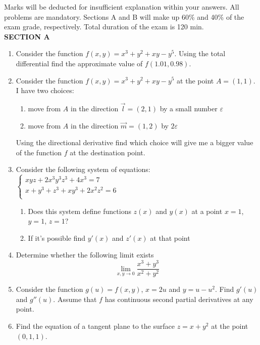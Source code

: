 \documentclass[pdftex,12pt,a4paper]{article}
\begin{document}


Marks will be deducted for insufficient explanation within your answers. All problems are mandatory. Sections A and B will make up 60\% and 40\% of the exam grade, respectively. Total duration of the exam is 120 min. \\

\textbf{SECTION A}
\vspace{20pt}

\begin{enumerate}
\item Consider the function $f(x,y)=x^3+y^2+xy-y^5$. Using the total differential find the approximate value of $f(1.01,0.98)$.
\item Consider the function $f(x,y)=x^3+y^2+xy-y^5$ at the point $A=(1,1)$. I have two choices:
\begin{enumerate}
\item move from $A$ in the direction $\vec{l}=(2,1)$ by a small number $\varepsilon$ 
\item move from $A$ in the direction $\vec{m}=(1,2)$ by $2\varepsilon$
\end{enumerate}
Using the directional derivative find which choice will give me a bigger value of the function $f$ at the destination point.

\item Consider the following system of equations:\\
$\left\{\begin{array}{l}
xyz+2x^3y^3z^3+4x^3=7\\
x+y^3+z^3+xy^3+2x^2z^2=6\\
\end{array}\right.$
\begin{enumerate}
\item Does this system define functions $z(x)$ and $y(x)$ at a point $x=1$, $y=1$, $z=1$?
\item If it's possible find $y'(x)$ and $z'(x)$ at that point
\end{enumerate}

\item Determine whether the following limit exists
\begin{equation} \nonumber
\lim_{x, y\to 0} \frac{x^3+y^3}{x^2+y^2}
\end{equation}

\item Consider the function $g(u)=f(x,y)$, $x=2u$ and $y=u-u^2$. Find $g'(u)$ and $g''(u)$. Assume that $f$ has continuous second partial derivatives at any point.

\item Find the equation of a tangent plane to the surface $z=x+y^2$ at the point $(0,1,1)$.

 

\end{enumerate}
\end{document}
